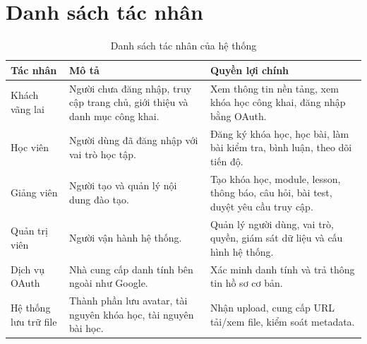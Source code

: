 \documentclass[12pt,a4paper]{report}
\begin{document}
\section{Danh sách tác nhân}
\begin{table}[H]
\centering
\caption{Danh sách tác nhân của hệ thống}
\begin{tabularx}{\textwidth}{L{3cm} Y Y}
\toprule
Tác nhân & Mô tả & Quyền lợi chính \\
\midrule
Khách vãng lai & Người chưa đăng nhập, truy cập trang chủ, giới thiệu và danh mục công khai. & Xem thông tin nền tảng, xem khóa học công khai, đăng nhập bằng OAuth. \\
Học viên & Người dùng đã đăng nhập với vai trò học tập. & Đăng ký khóa học, học bài, làm bài kiểm tra, bình luận, theo dõi tiến độ. \\
Giảng viên & Người tạo và quản lý nội dung đào tạo. & Tạo khóa học, module, lesson, thông báo, câu hỏi, bài test, duyệt yêu cầu truy cập. \\
Quản trị viên & Người vận hành hệ thống. & Quản lý người dùng, vai trò, quyền, giám sát dữ liệu và cấu hình hệ thống. \\
Dịch vụ OAuth & Nhà cung cấp danh tính bên ngoài như Google. & Xác minh danh tính và trả thông tin hồ sơ cơ bản. \\
Hệ thống lưu trữ file & Thành phần lưu avatar, tài nguyên khóa học, tài nguyên bài học. & Nhận upload, cung cấp URL tải/xem file, kiểm soát metadata. \\
\bottomrule
\end{tabularx}
\end{table}
\end{document}
